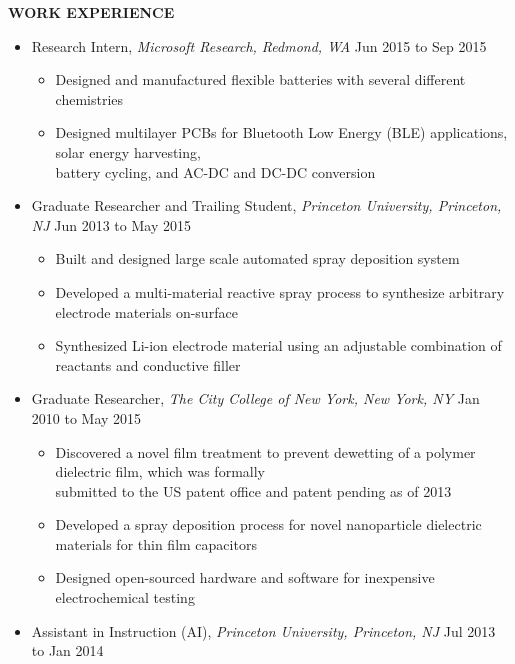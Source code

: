 \documentclass[9pt,letterpaper]{article}
\begin{document}
{\singlespacing
\noindent \textbf{WORK EXPERIENCE}

{\small
\begin{itemize}
  \item \noindent Research Intern, \emph{Microsoft Research, Redmond, WA} \hfill {\scriptsize Jun 2015 to Sep 2015}
    {\footnotesize\begin{itemize} 
        \item Designed and manufactured flexible batteries with several different chemistries
        \item Designed multilayer PCBs for Bluetooth Low Energy (BLE) applications, solar energy harvesting, \\battery cycling, and AC-DC and DC-DC conversion
    \end{itemize}}
  \item \noindent Graduate Researcher and Trailing Student, \emph{Princeton University, Princeton, NJ} \hfill {\scriptsize Jun 2013 to May 2015}
    {\footnotesize\begin{itemize} 
        \item Built and designed large scale automated spray deposition system
        \item Developed a multi-material reactive spray process to synthesize arbitrary electrode materials on-surface
        \item Synthesized Li-ion electrode material using an adjustable combination of reactants and conductive filler
    \end{itemize}}
  \item \noindent Graduate Researcher, \emph{The City College of New York, New York, NY} \hfill {\scriptsize Jan 2010 to May 2015}
    {\footnotesize\begin{itemize} 
        \item Discovered a novel film treatment to prevent dewetting of a polymer dielectric film, which was formally \\ submitted to the US patent office and patent pending as of 2013
        \item Developed a spray deposition process for novel nanoparticle dielectric materials for thin film capacitors
        \item Designed open-sourced hardware and software for inexpensive electrochemical testing 
    \end{itemize}}
  \item \noindent Assistant in Instruction (AI), \emph{Princeton University, Princeton, NJ} \hfill {\scriptsize Jul 2013 to Jan 2014} 

\end{itemize}}}
\end{document}
